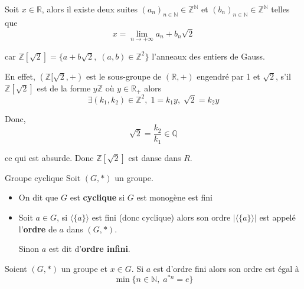 \begin{Example}{}{}
Soit $x \in \mathbb{R}$, alors il existe deux suites $(a_n) _{n \in \mathbb{N}} \in \mathbb{Z} ^{\mathbb{N}}$ et $(b_n) _{n \in \mathbb{N}} \in \mathbb{Z} ^{\mathbb{N}}$ telles que 
\begin{equation}
  x = \underset{n \to + \infty}{\lim} a_n+ b_n \sqrt{2}
\end{equation}

car $\mathbb{Z}[ \sqrt{2} ] = \{ a+b \sqrt{2}, \; (a,b) \in \mathbb{Z} ^{2} \}$ l'anneaux des entiers de Gauss.


En effet, $(\mathbb{Z}[\sqrt{2}, +)$ est le sous-groupe de $(\mathbb{R}, +)$ engendré par 1 et $\sqrt{2}$, s'il $\mathbb{Z}[ \sqrt{2}]$ est de la forme $y \mathbb{Z}$ où $y \in \mathbb{R}_+$ alors 
\begin{equation}
  \exists (k_1, k_2) \in \mathbb{Z} ^{2}, \; 1 = k_1y, \; \sqrt{2} = k_2 y
\end{equation}

Donc, 
\begin{equation}
  \sqrt{2} = \frac{k_2}{k_1}  \in \mathbb{Q}
\end{equation}

ce qui est absurde. Donc $\mathbb{Z}[ \sqrt{
  2
}]$ est danse dans $R$.
\end{Example}


\begin{Definition}[colbacktitle=red!75!black]{Groupe cyclique}{}
Soit $(G, *)$ un groupe. 
\begin{itemize}

    \item On dit que $G$ est \textbf{cyclique} si $G$ est monogène est fini 
    \item Soit $a \in G$, si $\langle \{a\} \rangle$ est fini (donc cyclique) alors son ordre $| \langle \{a\} \rangle|$ est appelé l'\textbf{ordre} de $a$ dans $(G, *)$.

      Sinon $a$ est dit d'\textbf{ordre infini}.

\end{itemize}

\end{Definition}

\begin{Prop}{}{}
Soient $(G, *)$ un groupe et $x \in G$. Si $a$ est d'ordre fini alors son ordre est égal à 
\begin{equation}
  \min \{ n\in \mathbb{N}, \; a ^{*n} = e\}
\end{equation}
\end{Prop}

